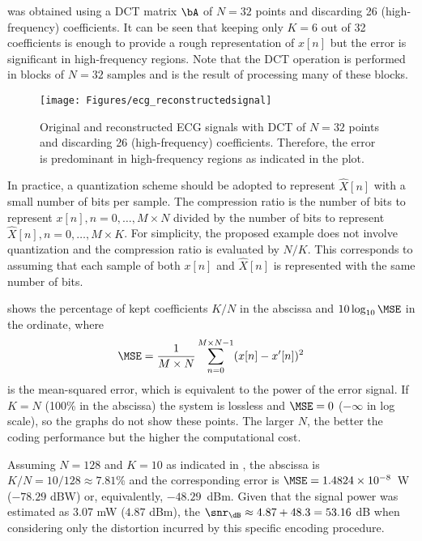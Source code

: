  was obtained using a DCT matrix $\bA$ of $N=32$ points and discarding 26 (high-frequency) coefficients. It can be seen that keeping only $K=6$ out of 32 coefficients is enough to provide a rough representation of $x[n]$ but the error is significant in high-frequency regions. Note that the DCT operation is performed in blocks of $N=32$ samples and  is the result of processing many of these blocks.

\begin{figure}[!htb]
        \centering
                \texttt{[image: Figures/ecg\_reconstructedsignal]}             
        \caption[{Original and reconstructed ECG signals with DCT of $N=32$ points and discarding 26 (high-frequency) coefficients.}]{Original and reconstructed ECG signals with DCT of $N=32$ points and discarding 26 (high-frequency) coefficients. Therefore, the error is predominant in high-frequency regions as indicated in the plot.\label{fig:ecg_reconstructedsignal}}
\end{figure}

In practice, a quantization scheme should be adopted to represent $\hat X[n]$ with a small number of bits per sample. The compression ratio is the number of bits to represent $x[n],n=0,\ldots,M \times N$ divided by the number of bits to represent $\hat X[n],n=0,\ldots,M\times K$. For simplicity, the proposed example does not involve quantization and the compression ratio is evaluated by $N/K$. This corresponds to assuming that each sample of both $x[n]$ and $\hat X[n]$ is represented with the same number of bits.

 shows the percentage of kept coefficients $K/N$ in the abscissa and $10 \log_{10} \MSE$ in the ordinate, where
\[\MSE = \frac{1}{M \times N} \sum_{n=0}^{M \times N-1}(x[n]-x'[n])^2\]
is the mean-squared error, which is equivalent to the power of the error signal. If $K=N$ (100\% in the abscissa) the system is lossless and $\MSE=0$ ($-\infty$ in log scale), so the graphs do not show these points. The larger $N$, the better the coding performance but the higher the computational cost.

Assuming $N=128$ and $K=10$ as indicated in , the abscissa is $K/N=10/128 \approx 7.81$\% and the corresponding error is $\MSE = 1.4824 \times 10^{-8}$~W ($-78.29$ dBW) or, equivalently, $-48.29$~dBm.
Given that the signal power was estimated as 3.07 mW ($4.87$ dBm), the $\snr_\dB \approx 4.87 + 48.3 = 53.16$ dB when considering only the distortion incurred by this specific encoding procedure.

